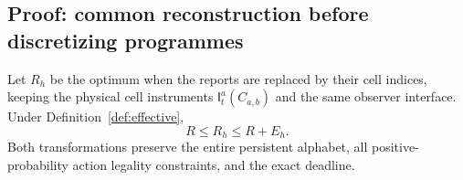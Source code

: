 \subsection{Proof: common reconstruction before discretizing programmes}
\begin{lemma}\label{lem:report_reduction}
Let $R_h$ be the optimum when the reports are replaced by their cell indices, keeping the physical cell instruments $\mathsf I_t^a(C_{a,b})$ and the same observer interface. Under Definition~\ref{def:effective},
\begin{equation}\label{eq:report_reduction}
 R\le R_h\le R+E_h.
\end{equation}
Both transformations preserve the entire persistent alphabet, all positive-probability action legality constraints, and the exact deadline.
\end{lemma}
